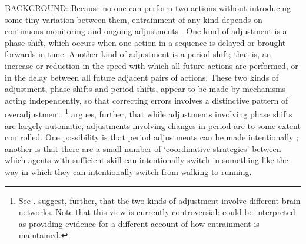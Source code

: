 \documentclass[12pt,\papersize]{extarticle}
\begin{document}
BACKGROUND:
Because no one can perform two actions without introducing some tiny variation between them, entrainment of any kind depends on continuous monitoring and ongoing adjustments \citep[p.~976]{repp:2005_sensorimotor}.
One kind of adjustment is a phase shift, which occurs when one action in a sequence is delayed or brought forwards in time.
Another kind of adjustment is a period shift; that is, an increase or reduction in the speed with which all future actions are performed, or in the delay between all future adjacent pairs of actions.
These two kinds of adjustment,
phase shifts and period shifts,
appear to be made by mechanisms acting independently, so that correcting errors involves a distinctive pattern of overadjustment.%
\footnote{%
See \citet[pp.~474–6]{schulze:2005_keeping}. \citet{keller:2014_rhythm} suggest, further, that the two kinds of adjustment involve different brain networks.
Note that this view is currently controversial: \citet{loehr:2011_temporal} could be interpreted as providing evidence for a different account of how entrainment is maintained.
}
\citet[p.~987]{repp:2005_sensorimotor} argues, further, that while adjustments involving phase shifts are largely automatic, adjustments involving changes in period are to some extent controlled.
One possibility is that period adjustments can be made intentionally \citep[as][p.~2599 hint]{fairhurst:2013_being};
another is that there are a small number of ‘coordinative strategies’ \citep{repp:2008_sensorimotor} between which agents with sufficient skill can intentionally switch in something like the way in which they can intentionally switch from walking to running.
 
\end{document}
